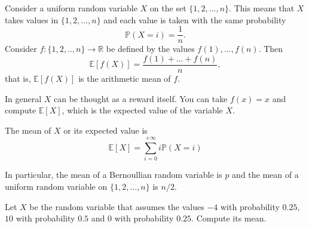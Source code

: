 \begin{example}

Consider a uniform random variable  $X$ on the set $\{1,2,...,n\}$. This means that $X$ takes values in $\{1,2,...,n\}$ and each value is taken with the same probability 
$$
\mathbb P(X = i) = \frac{1}{n}.
$$
Consider $f: \{1,2,..,n\} \to \mathbb R $ be defined by the values $f(1),...,f(n)$. Then 
\begin{equation}
    \label{e:arithmetic_mean}
    \mathbb E[f(X)] = \frac{f(1)+ ...+ f(n)}{n},
\end{equation}
that is, $\mathbb E[f(X)]$ is the arithmetic mean of $f$. 
\end{example}

In general $X$ can be thought as a reward itself. You can take $f(x) = x$ and compute $\mathbb E[X]$, which is the expected value of the variable $X$. 
\begin{definition}[Mean of $X$ ]
The mean of $X$ or its expected value is 
\begin{equation}
    \label{e:mean}
\mathbb E[X] = \sum_{i= 0 }^{+\infty } i\mathbb P(X = i)
\end{equation}
\end{definition}
In particular, the mean of a Bernoullian random variable is $p$ and the mean of a uniform random variable on $\{1,2,...,n\}$ is $n/2$. 


\begin{ExerciseList}

    \Exercise Let $X$ be the random variable that assumes the values $-4$ with probability $0.25$, $10$ with probability $0.5$ and $0$ with probability $0.25$. Compute its mean. 

\end{ExerciseList}

